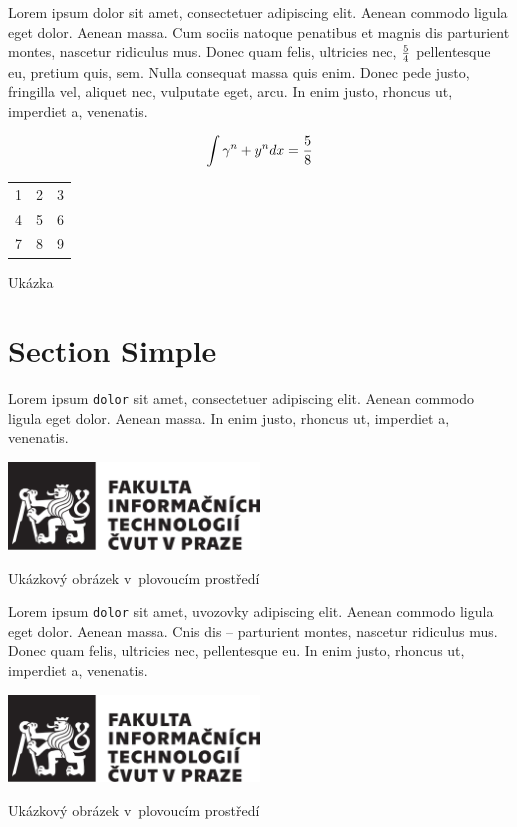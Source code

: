 Lorem ipsum dolor sit amet, consectetuer adipiscing elit. Aenean commodo ligula eget dolor. Aenean massa. Cum sociis natoque penatibus et magnis dis parturient montes, nascetur ridiculus mus. Donec quam felis, ultricies nec, \({5} \over {4}\) pellentesque eu, pretium quis, sem. Nulla consequat massa quis enim. Donec pede justo, fringilla vel, aliquet nec, vulputate eget, arcu. In enim justo, rhoncus ut, imperdiet a, venenatis.

\[ \int {\gamma^n + y^n } dx = { 5 \over 8} \]


\begin{fig:table}
   \begin{tabular}{| l c r |}
      \hline
      1 & 2 & 3 \\
      4 & 5 & 6 \\
      7 & 8 & 9 \\
      \hline
   \end{tabular}
   \caption[První příklad tabulky]{Ukázka}\label{tab:example1}
\end{fig:table}

\section{Section Simple}
Lorem ipsum \verb|dolor| sit amet, consectetuer adipiscing elit. Aenean commodo ligula eget dolor. Aenean massa. In enim justo, rhoncus ut, imperdiet a, venenatis.


\begin{fig:illustration}
	\includegraphics[width=0.5\textwidth, angle=30]{dependencies/CVUTLogo}
	\caption[První příklad obrázku]{Ukázkový obrázek v~plovoucím prostředí}\label{pic:example1}
\end{fig:illustration}


Lorem ipsum \verb|dolor| sit amet, uvozovky adipiscing elit. Aenean commodo ligula eget dolor. Aenean massa. Cnis dis -- parturient montes, nascetur ridiculus mus. Donec quam felis, ultricies nec, pellentesque eu. In enim justo, rhoncus ut, imperdiet a, venenatis.


\begin{fig:illustration}
	\includegraphics[width=0.5\textwidth]{dependencies/CVUTLogo}
	\caption[Druhý příklad obrázku]{Ukázkový obrázek v~plovoucím prostředí}\label{pic:example2}
\end{fig:illustration}

